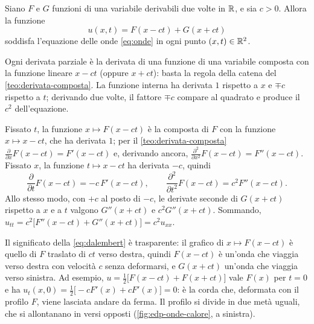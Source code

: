 \begin{proposizione}\label{prop:dalembert}
Siano $F$ e $G$ funzioni di una variabile derivabili due volte in $\mathbb{R}$, e sia $c>0$.
Allora la funzione
\begin{equation}\label{eq:dalembert}
  u(x,t)=F(x-ct)+G(x+ct)
\end{equation}
soddisfa l'equazione delle onde \eqref{eq:onde} in ogni punto $(x,t)\in\mathbb{R}^{2}$.
\end{proposizione}

\begin{schema}
\end{schema}

\begin{strategia}
Ogni derivata parziale è la derivata di una funzione di una variabile composta con la
funzione lineare $x-ct$ (oppure $x+ct$): basta la regola della catena del
\cref{teo:derivata-composta}. La funzione interna ha derivata $1$ rispetto a $x$ e $\mp c$
rispetto a $t$; derivando due volte, il fattore $\mp c$ compare al quadrato e produce il
$c^{2}$ dell'equazione.
\end{strategia}

\begin{dimostrazione}
Fissato $t$, la funzione $x\mapsto F(x-ct)$ è la composta di $F$ con la funzione
$x\mapsto x-ct$, che ha derivata $1$; per il \cref{teo:derivata-composta}
$\frac{\partial}{\partial x}F(x-ct)=F'(x-ct)$ e, derivando ancora,
$\frac{\partial^{2}}{\partial x^{2}}F(x-ct)=F''(x-ct)$. Fissato $x$, la funzione
$t\mapsto x-ct$ ha derivata $-c$, quindi
\[
  \frac{\partial}{\partial t}F(x-ct)=-c\,F'(x-ct), \qquad
  \frac{\partial^{2}}{\partial t^{2}}F(x-ct)=c^{2}F''(x-ct).
\]
Allo stesso modo, con $+c$ al posto di $-c$, le derivate seconde di $G(x+ct)$ rispetto a
$x$ e a $t$ valgono $G''(x+ct)$ e $c^{2}G''(x+ct)$. Sommando,
$u_{tt}=c^{2}\bigl[F''(x-ct)+G''(x+ct)\bigr]=c^{2}u_{xx}$.
\end{dimostrazione}

Il significato della \eqref{eq:dalembert} è trasparente: il grafico di $x\mapsto F(x-ct)$
è quello di $F$ traslato di $ct$ verso destra, quindi $F(x-ct)$ è un'onda che viaggia
verso destra con velocità $c$ senza deformarsi, e $G(x+ct)$ un'onda che viaggia verso
sinistra. Ad esempio, $u=\frac12\bigl[F(x-ct)+F(x+ct)\bigr]$ vale $F(x)$ per $t=0$ e ha
$u_{t}(x,0)=\frac12\bigl[-cF'(x)+cF'(x)\bigr]=0$: è la corda che, deformata con il profilo $F$,
viene lasciata andare da ferma. Il profilo si divide in due metà uguali, che si
allontanano in versi opposti (\cref{fig:edp-onde-calore}, a sinistra).

